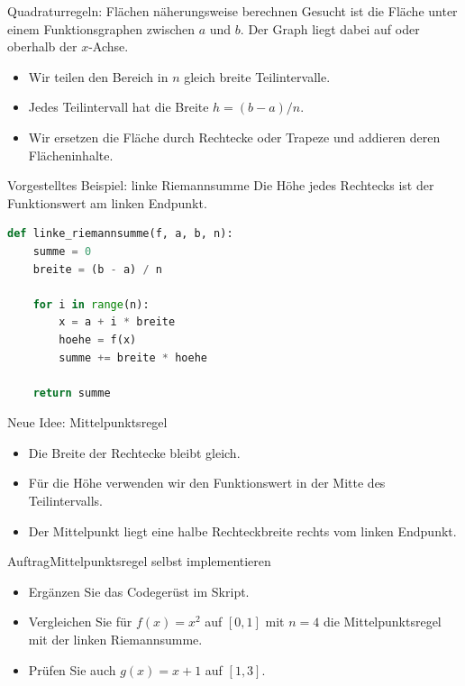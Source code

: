 \begin{frame}{Quadraturregeln: Flächen näherungsweise berechnen}
    Gesucht ist die Fläche unter einem Funktionsgraphen zwischen $a$ und $b$.
    Der Graph liegt dabei auf oder oberhalb der $x$-Achse.
    \begin{itemize}
        \item Wir teilen den Bereich in $n$ gleich breite Teilintervalle.
        \item Jedes Teilintervall hat die Breite $h=(b-a)/n$.
        \item Wir ersetzen die Fläche durch Rechtecke oder Trapeze und addieren deren Flächeninhalte.
    \end{itemize}
\end{frame}

\begin{frame}[fragile]{Vorgestelltes Beispiel: linke Riemannsumme}
    Die Höhe jedes Rechtecks ist der Funktionswert am linken Endpunkt.
    \begin{lstlisting}[language=Python, basicstyle=\ttfamily\small]
def linke_riemannsumme(f, a, b, n):
    summe = 0
    breite = (b - a) / n

    for i in range(n):
        x = a + i * breite
        hoehe = f(x)
        summe += breite * hoehe

    return summe
    \end{lstlisting}
\end{frame}

\begin{frame}{Neue Idee: Mittelpunktsregel}
    \begin{itemize}
        \item Die Breite der Rechtecke bleibt gleich.
        \item Für die Höhe verwenden wir den Funktionswert in der Mitte des Teilintervalls.
        \item Der Mittelpunkt liegt eine halbe Rechteckbreite rechts vom linken Endpunkt.
    \end{itemize}
\end{frame}

\begin{frame}{Auftrag}{Mittelpunktsregel selbst implementieren}
    \begin{itemize}
        \item Ergänzen Sie das Codegerüst im Skript.
        \item Vergleichen Sie für $f(x)=x^2$ auf $[0,1]$ mit $n=4$ die Mittelpunktsregel mit der linken Riemannsumme.
        \item Prüfen Sie auch $g(x)=x+1$ auf $[1,3]$.
    \end{itemize}
\end{frame}

